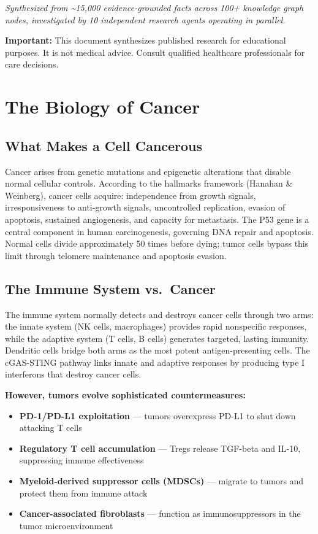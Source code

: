 \emph{Synthesized from \textasciitilde15,000 evidence-grounded facts
across 100+ knowledge graph nodes, investigated by 10 independent
research agents operating in parallel.}

\textbf{Important:} This document synthesizes published research for
educational purposes. It is not medical advice. Consult qualified
healthcare professionals for care decisions.

\newpage

\section{The Biology of Cancer}\label{the-biology-of-cancer}

\subsection{What Makes a Cell
Cancerous}\label{what-makes-a-cell-cancerous}

Cancer arises from genetic mutations and epigenetic alterations that
disable normal cellular controls. According to the hallmarks framework
(Hanahan \& Weinberg), cancer cells acquire: independence from growth
signals, irresponsiveness to anti-growth signals, uncontrolled
replication, evasion of apoptosis, sustained angiogenesis, and capacity
for metastasis. The P53 gene is a central component in human
carcinogenesis, governing DNA repair and apoptosis. Normal cells divide
approximately 50 times before dying; tumor cells bypass this limit
through telomere maintenance and apoptosis evasion.

\subsection{The Immune System
vs.~Cancer}\label{the-immune-system-vs.-cancer}

The immune system normally detects and destroys cancer cells through two
arms: the innate system (NK cells, macrophages) provides rapid
nonspecific responses, while the adaptive system (T cells, B cells)
generates targeted, lasting immunity. Dendritic cells bridge both arms
as the most potent antigen-presenting cells. The cGAS-STING pathway
links innate and adaptive responses by producing type I interferons that
destroy cancer cells.

\textbf{However, tumors evolve sophisticated countermeasures:}

\begin{itemize}
\tightlist
\item
  \textbf{PD-1/PD-L1 exploitation} --- tumors overexpress PD-L1 to shut
  down attacking T cells
\item
  \textbf{Regulatory T cell accumulation} --- Tregs release TGF-beta and
  IL-10, suppressing immune effectiveness
\item
  \textbf{Myeloid-derived suppressor cells (MDSCs)} --- migrate to
  tumors and protect them from immune attack
\item
  \textbf{Cancer-associated fibroblasts} --- function as
  immunosuppressors in the tumor microenvironment
\end{itemize}

